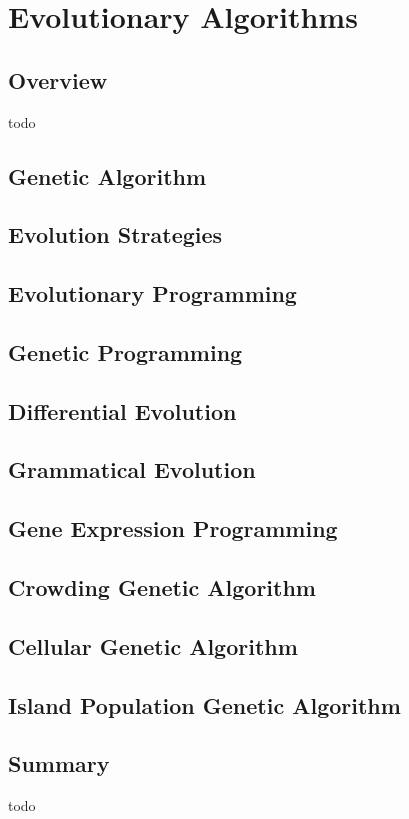 \chapter{Evolutionary Algorithms}
\label{ch:evolutionary}

\section{Overview}
todo

\section{Genetic Algorithm}
\section{Evolution Strategies}
\section{Evolutionary Programming}
\section{Genetic Programming}
\section{Differential Evolution}
\section{Grammatical Evolution}
\section{Gene Expression Programming}
\section{Crowding Genetic Algorithm}
\section{Cellular Genetic Algorithm}
\section{Island Population Genetic Algorithm}

\section{Summary}
todo
